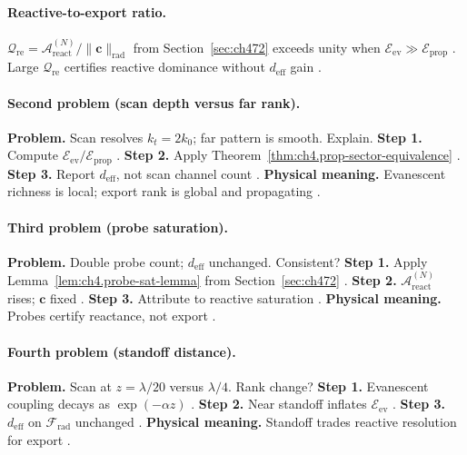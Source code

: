 \paragraph{Reactive-to-export ratio.}
\(\mathcal{Q}_{\mathrm{re}}=\mathcal{A}_{\mathrm{react}}^{(N)}/\|\mathbf{c}\|_{\mathrm{rad}}\) from Section~\ref{sec:ch472} exceeds unity when
\(\mathcal{E}_{\mathrm{ev}}\gg\mathcal{E}_{\mathrm{prop}}\) \cite{harrington2001,stratton1941,devaney2004,hansen1988,jackson1999}. Large \(\mathcal{Q}_{\mathrm{re}}\) certifies
reactive dominance without \(d_{\mathrm{eff}}\) gain \cite{stratton1941,harrington2001}.

\paragraph{Second problem (scan depth versus far rank).}
\textbf{Problem.} Scan resolves \(k_{t}=2k_{0}\); far pattern is smooth. Explain.
\textbf{Step 1.} Compute \(\mathcal{E}_{\mathrm{ev}}/\mathcal{E}_{\mathrm{prop}}\) \cite{jackson1999,stratton1941,harrington2001}.
\textbf{Step 2.} Apply Theorem~\ref{thm:ch4.prop-sector-equivalence} \cite{devaney2004,hansen1988}.
\textbf{Step 3.} Report \(d_{\mathrm{eff}}\), not scan channel count \cite{harrington2001,stratton1941}.
\textbf{Physical meaning.} Evanescent richness is local; export rank is global and propagating \cite{jackson1999,devaney2004}.

\paragraph{Third problem (probe saturation).}
\textbf{Problem.} Double probe count; \(d_{\mathrm{eff}}\) unchanged. Consistent?
\textbf{Step 1.} Apply Lemma~\ref{lem:ch4.probe-sat-lemma} from Section~\ref{sec:ch472} \cite{harrington2001,stratton1941}.
\textbf{Step 2.} \(\mathcal{A}_{\mathrm{react}}^{(N)}\) rises; \(\mathbf{c}\) fixed \cite{devaney2004,hansen1988}.
\textbf{Step 3.} Attribute to reactive saturation \cite{jackson1999,harrington2001}.
\textbf{Physical meaning.} Probes certify reactance, not export \cite{stratton1941,devaney2004}.

\paragraph{Fourth problem (standoff distance).}
\textbf{Problem.} Scan at \(z=\lambda/20\) versus \(\lambda/4\). Rank change?
\textbf{Step 1.} Evanescent coupling decays as \(\exp(-\alpha z)\) \cite{jackson1999,hansen1988,harrington2001}.
\textbf{Step 2.} Near standoff inflates \(\mathcal{E}_{\mathrm{ev}}\) \cite{stratton1941,devaney2004}.
\textbf{Step 3.} \(d_{\mathrm{eff}}\) on \(\mathcal{F}_{\mathrm{rad}}\) unchanged \cite{harrington2001,jackson1999}.
\textbf{Physical meaning.} Standoff trades reactive resolution for export \cite{hansen1988,stratton1941}.

